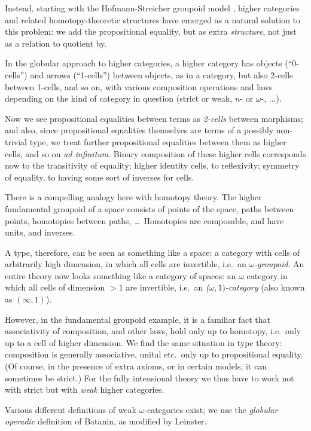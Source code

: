 \begin{para}Instead, starting with the Hofmann-Streicher groupoid model \cite{hofmann-streicher}, higher categories and related homotopy-theoretic structures have emerged as a natural solution to this problem: we add the propositional equality, but as extra \emph{structure}, not just as a relation to quotient by.

In the globular approach to higher categories, a higher category has objects (``0-cells'') and arrows (``1-cells'') between objects, as in a category, but also 2-cells between 1-cells, and so on, with various composition operations and laws depending on the kind of category in question (strict or weak, $n$- or $\omega$-, $\ldots$).

Now we see propositional equalities between terms as \emph{2-cells} between morphisms; and also, since propositional equalities themselves are terms of a possibly non-trivial type, we treat further propositional equalities between them as higher cells, and so on \emph{ad infinitum}.  Binary composition of these higher cells corresponds now to the transitivity of equality; higher identity cells, to reflexivity; symmetry of equality, to having some sort of inverses for cells.

There is a compelling analogy here with homotopy theory.  The higher fundamental groupoid of a space consists of points of the space, paths between points, homotopies between paths, \ldots\ Homotopies are composable, and have units, and inverses.

A type, therefore, can be seen as something like a space: a category with cells of arbitrarily high dimension, in which all cells are invertible, i.e.\ an \emph{$\omega$-groupoid}.  An entire theory now looks something like a category of spaces: an $\omega$ category in which all cells of dimension $> 1$ are invertible, i.e.\ an \emph{($\omega,1)$-category} (also known as $(\infty,1)$).

However, in the fundamental groupoid example, it is a familiar fact that associativity of composition, and other laws, hold only up to homotopy, i.e.\ only up to a cell of higher dimension.  We find the same situation in type theory: composition is generally associative, unital etc.\ only up to propositional equality.  (Of course, in the presence of extra axioms, or in certain models, it can sometimes be strict.)  For the fully intensional theory we thus have to work not with strict but with \emph{weak} higher categories.

Various different definitions of weak $\omega$-categories exist; we use the \emph{globular operadic} definition of Batanin, as modified by Leinster. 
\end{para}

